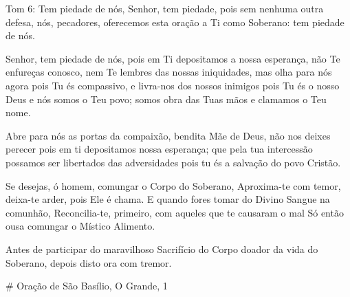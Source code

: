 \documentclass{subfiles}
\begin{document}
\mercy{} \thrice{}

\Doxology{}

\ourFather{}


Tom 6: Tem piedade de nós, Senhor, tem piedade, pois sem nenhuma outra
defesa, nós, pecadores, oferecemos esta oração a Ti como Soberano: tem
piedade de nós.

\doxology{}

Senhor, tem piedade de nós, pois em Ti depositamos a nossa esperança, não Te
enfureças conosco, nem Te lembres das nossas iniquidades, mas olha para nós
agora pois Tu és compassivo, e livra-nos dos nossos inimigos pois Tu és o nosso
Deus e nós somos o Teu povo; somos obra das Tuas mãos e clamamos o Teu nome.

\nowandever{}

Abre para nós as portas da compaixão, bendita Mãe de Deus, não nos
deixes perecer pois em ti depositamos nossa esperança; que pela tua
intercessão possamos ser libertados das adversidades pois tu és a salvação do
povo Cristão.

\mercy{} 



Se desejas, ó homem, comungar o Corpo do Soberano,
Aproxima-te com temor, deixa-te arder, pois Ele é chama.
E quando fores tomar do Divino Sangue na comunhão,
Reconcilia-te, primeiro, com aqueles que te causaram o mal
Só então ousa comungar o Místico Alimento.


Antes de participar do maravilhoso Sacrifício do Corpo doador da vida do
Soberano, depois disto ora com tremor.

# Oração de São Basílio, O Grande, 1
\end{document}
